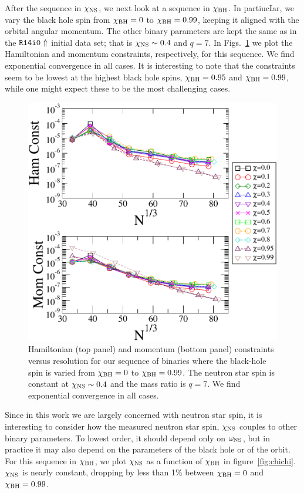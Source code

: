 After the sequence in $\chi_{\rm NS}$, we next look at a sequence in
$\chi_{\rm BH}$. In partiucIar, we vary the black hole spin from
$\chi_{\rm BH}=0$ to $\chi_{\rm BH}=0.99$, keeping it aligned with the orbital angular
momentum.
 The other binary parameters are kept the same
as in the ${\tt R14i0\Uparrow}$ initial data set; that is $\chi_{\rm
  NS}\sim0.4$ and $q=7$. In Figs.~\ref{fig:chiSeqHam} we plot the Hamiltonian and momentum constraints,
respectively, for this sequence. We find exponential convergence in
all cases. It is interesting to note that the constraints seem to be
lowest at the highest black hole spins, $\chi_{\rm BH}=0.95$ and
$\chi_{\rm BH}=0.99$, while one might expect these to be the most
challenging cases.

\begin{figure}
\includegraphics[width=0.95\columnwidth]{chap4/chiSeqHam}
\caption[Hamiltonian and momentum for the sequence in $\chi_{\rm BH}$.]{\label{fig:chiSeqHam}Hamiltonian (top panel) and momentum (bottom panel) constraints versus
  resolution for our sequence of binaries where the black-hole spin is
  varied from $\chi_{\rm BH}=0$ to $\chi_{\rm BH}=0.99$. The neutron star spin is constant at $\chi_{\rm NS}\sim 0.4$ and the mass ratio is $q=7$. We find exponential convergence in all cases.}
\end{figure}

Since in this work we are largely concerned with neutron star spin, it
is interesting to consider how the measured neutron star spin,
$\chi_{\rm NS}$ couples to other binary parameters. To lowest order,
it should depend only on $\omega_{\rm NS}$, but in practice it may
also depend on the parameters of the black hole or of the orbit. For this sequence in
$\chi_{\rm BH}$, we plot $\chi_{\rm NS}$ as a function of $\chi_{\rm
  BH}$ in figure~\ref{fig:chichi}. $\chi_{\rm NS}$ is nearly constant,
dropping by less than 1\% between $\chi_{\rm BH}=0$ and $\chi_{\rm BH}=0.99$.

